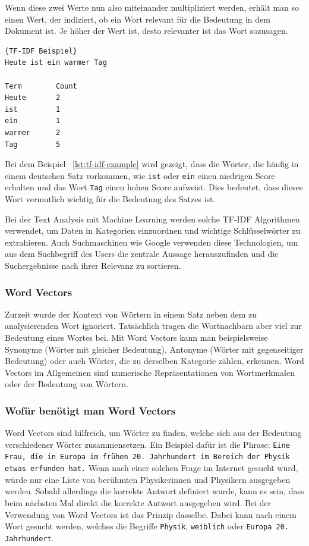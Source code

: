 Wenn diese zwei Werte nun also miteinander multipliziert werden, erhält man so einen Wert, der indiziert, ob ein Wort relevant für die Bedeutung in dem Dokument ist.
Je höher der Wert ist, desto relevanter ist das Wort sozusagen.

\begin{lstlisting}[label={lst:tf-idf-example},caption={TF-IDF Beispiel}]{TF-IDF Beispiel}
Heute ist ein warmer Tag

Term        Count
Heute       2
ist         1
ein         1
warmer      2
Tag         5
\end{lstlisting}

Bei dem Beispiel ~\ref{lst:tf-idf-example} wird gezeigt, dass die Wörter, die häufig in einem deutschen Satz vorkommen, wie \texttt{ist} oder \texttt{ein} einen niedrigen Score erhalten und das Wort \texttt{Tag} einen hohen Score aufweist.
Dies bedeutet, dass dieses Wort vermutlich wichtig für die Bedeutung des Satzes ist.

Bei der Text Analysis mit Machine Learning werden solche TF-IDF Algorithmen verwendet, um Daten in Kategorien einzuordnen und wichtige Schlüsselwörter zu extrahieren.
Auch Suchmaschinen wie Google verwenden diese Technologien, um aus dem Suchbegriff des Users die zentrale Aussage herauszufinden und die Suchergebnisse nach ihrer Relevanz zu sortieren.\cite{tfIdf}

\subsubsection{Word Vectors}\label{subsubsec:word-vectors}

Zurzeit wurde der Kontext von Wörtern in einem Satz neben dem zu analysierenden Wort ignoriert.
Tatsächlich tragen die Wortnachbarn aber viel zur Bedeutung eines Wortes bei.
Mit Word Vectors kann man beispielsweise Synonyme (Wörter mit gleicher Bedeutung), Antonyme (Wörter mit gegenseitiger Bedeutung) oder auch Wörter, die zu derselben Kategorie zählen, erkennen.
Word Vectors im Allgemeinen sind numerische Repräsentationen von Wortmerkmalen oder der Bedeutung von Wörtern.

\subsubsection{Wofür benötigt man Word Vectors}\label{subsubsec:why-word-vectors}

Word Vectors sind hilfreich, um Wörter zu finden, welche sich aus der Bedeutung verschiedener Wörter zusammensetzen.
Ein Beispiel dafür ist die Phrase: \texttt{Eine Frau, die in Europa im frühen 20. Jahrhundert im Bereich der Physik etwas erfunden hat.}
Wenn nach einer solchen Frage im Internet gesucht würd, würde nur eine Liste von berühmten Physikerinnen und Physikern ausgegeben werden.
Sobald allerdings die korrekte Antwort definiert wurde, kann es sein, dass beim nächsten Mal direkt die korrekte Antwort ausgegeben wird.
Bei der Verwendung von Word Vectors ist das Prinzip dasselbe.
Dabei kann nach einem Wort gesucht werden, welches die Begriffe \texttt{Physik}, \texttt{weiblich} oder \texttt{Europa 20. Jahrhundert}.\cite{nlpInAction}

